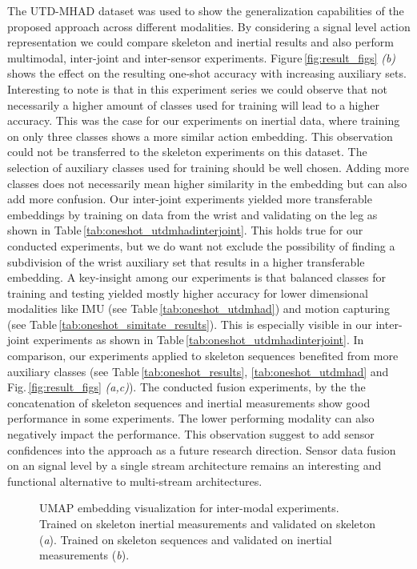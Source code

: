 \documentclass[10pt,conference,a4paper]{IEEEtran}
\def\figname{Fig.\,}
\def\fignamelong{Figure\,}
\def\tabname{Table\,}
\begin{document}
The UTD-MHAD dataset was used to show the generalization capabilities of the proposed approach across different modalities. By considering a signal level action representation we could compare skeleton and inertial results and also perform multimodal, inter-joint  and inter-sensor experiments. \fignamelong \ref{fig:result_figs} \textit{(b)} shows the effect on the resulting one-shot accuracy with increasing auxiliary sets. Interesting to note is that in this experiment series we could observe that not necessarily a higher amount of classes used for training will lead to a higher accuracy. This was the case for our experiments on inertial data, where training on only three classes shows a more similar action embedding. This observation could not be transferred to the skeleton experiments on this dataset. 
The selection of auxiliary classes used for training should be well chosen. Adding more classes does not necessarily mean higher similarity in the embedding but can also add more confusion.
Our inter-joint experiments yielded more transferable embeddings by training on data from the wrist and validating on the leg as shown in \tabname \ref{tab:oneshot_utdmhadinterjoint}.  This holds true for our conducted experiments, but we do want not exclude the possibility of finding a subdivision of the wrist auxiliary set that results in a higher transferable embedding. 
A key-insight among our experiments is that balanced classes for training and testing yielded mostly higher accuracy for lower dimensional modalities like IMU (see \tabname \ref{tab:oneshot_utdmhad}) and motion capturing (see \tabname \ref{tab:oneshot_simitate_results}). This is especially visible in our inter-joint experiments as shown in \tabname \ref{tab:oneshot_utdmhadinterjoint}. In comparison, our experiments applied to skeleton sequences benefited from more auxiliary classes (see \tabname \ref{tab:oneshot_results}, \ref{tab:oneshot_utdmhad} and \figname \ref{fig:result_figs} \textit{(a,c)}). 
The conducted fusion experiments, by the the concatenation of skeleton sequences and inertial measurements show good performance in some experiments. The lower performing modality can also negatively impact the performance. This observation suggest to add sensor confidences into the approach as a future research direction. Sensor data fusion on an signal level by a single stream architecture remains an interesting and functional alternative to multi-stream architectures.
\begin{figure}[th] \centering
  \caption{UMAP embedding visualization for inter-modal experiments. Trained on skeleton inertial measurements and validated on skeleton (\textit{a}). Trained on skeleton sequences and validated on inertial measurements (\textit{b}).}
  \label{fig:umap_embedding_intermodal}
\end{figure}
\end{document}
